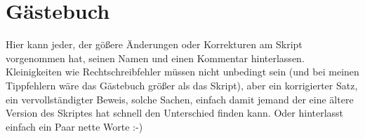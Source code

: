 \documentclass[paper = A4, fontsize=12pt, numbers=noendperiod, chapterprefix=true]{scrbook}
\theoremstyle{break}
\theoremstyle{nonumberbreak}
\theoremstyle{nonumberplain}
\begin{document}




\def\indexspace{\par\medskip}


\printglossaries






\chapter{G\"astebuch}
Hier kann jeder, der g\"o\ss ere \"Anderungen oder Korrekturen am Skript vorgenommen hat, seinen Namen und einen Kommentar hinterlassen. Kleinigkeiten wie Rechtschreibfehler m\"ussen nicht unbedingt sein (und bei meinen Tippfehlern w\"are das G\"astebuch gr\"o\ss er als das Skript), aber ein korrigierter Satz, ein vervollst\"andigter Beweis, solche Sachen, einfach damit jemand der eine \"altere Version des Skriptes hat schnell den Unterschied finden kann. Oder hinterlasst einfach ein Paar nette Worte :-)
\end{document}

